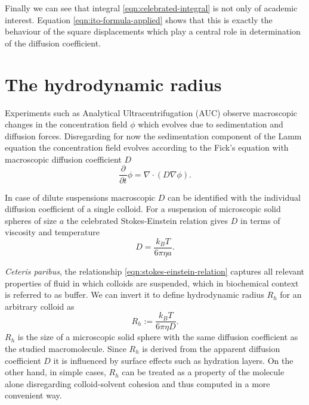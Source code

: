 \documentclass{doctoral}
\newcommand{\pd}{\partial}
\newcommand{\dd}{\mathrm{d}}
\begin{document}
Finally we can see that integral \eqref{eqn:celebrated-integral} is not only of academic interest.
Equation \eqref{eqn:ito-formula-applied} shows that this is exactly the behaviour of the square displacements which play a central role in determination of the diffusion coefficient.


\section{The hydrodynamic radius}

Experiments such as Analytical Ultracentrifugation (AUC) observe macroscopic changes in the concentration field $\phi$ which evolves due to sedimentation and diffusion forces.
Disregarding for now the sedimentation component of the Lamm equation the concentration field evolves according to the Fick's equation with macroscopic diffusion coefficient $D$
\begin{equation}
    \frac{\pd}{\pd t} \phi = \nabla \cdot ( D \nabla \phi ).
    \label{eqn:ficks-law}
\end{equation}

In case of dilute suspensions macroscopic $D$ can be identified with the individual diffusion coefficient of a single colloid.
For a suspension of microscopic solid spheres of size $a$ the celebrated Stokes-Einstein relation gives $D$ in terms of viscosity and temperature
\begin{equation}
    D = \frac{k_B T}{6 \pi \eta a}.
    \label{eqn:stokes-einstein-relation}
\end{equation}

\textit{Ceteris paribus}, the relationship \eqref{eqn:stokes-einstein-relation} captures all relevant properties of fluid in which colloids are suspended, which in biochemical context is referred to as buffer.
We can invert it to define hydrodynamic radius $R_h$ for an arbitrary colloid as
\begin{equation}
    R_h :=  \frac{k_B T}{6 \pi \eta D}.
    \label{eqn:hydrodynamic-radius-definition}
\end{equation}
$R_h$ is the size of a microscopic solid sphere with the same diffusion coefficient as the studied macromolecule.
Since $R_h$ is derived from the apparent diffusion coefficient $D$ it is influenced by surface effects such as hydration layers.
On the other hand, in simple cases, $R_h$ can be treated as a property of the molecule alone disregarding colloid-solvent cohesion and thus computed in a more convenient way.
\end{document}
